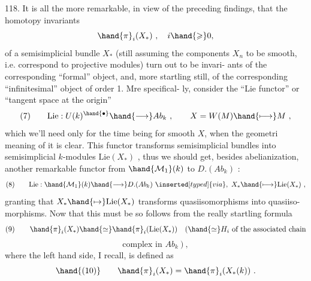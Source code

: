 118. It is all the more remarkable, in view of the preceding findings,
that the homotopy invariants
\[ \hand{\pi}_i(X_*) \ , \quad i \hand{\geqslant} 0 , \]
of a  semisimplicial  bundle $X_*$ (still assuming the components $X_n$ to be
smooth, i.e.  correspond to projective modules) turn out to be invari-%
ants of the corresponding ``formal'' object, and, more startling still,
of the corresponding ``infinitesimal'' object of order 1. Mre specifical-%
ly, consider the ``Lie functor'' or ``tangent space at the origin''
\[ (7) \qquad \mathrm{Lie}: U(k)^{\hand{\bullet}} \hand{\longrightarrow} Ab_k \ , \qquad X = W(M) \hand{\longmapsto} M \ , \]
which we'll need only for the time being for smooth $X$, when the geometri
meaning of it is clear. This functor transforms semisimplicial  bundles
into semisimplicial $k$-modules $\mathrm{Lie}(X_*)$ , thus we should get, besides
abelianization, another remarkable functor\hand{,} from $\hand{\mathcal{M}_1}(k)$  to $D.(Ab_k)$ :
\[ (8) \qquad \mathrm{Lie}: \hand{\mathcal{M}_1}(k) \hand{\longrightarrow} D.(Ab_k) \ \inserted[typed]{via}, \ X_* \hand{\longmapsto} \mathrm{Lie}(X_*) \ , \]
granting that $X_* \hand{\mapsto} \mathrm{Lie}(X_*)$ transforms quasiisomorphisms into quasiiso-%
morphisms. Now that this must be so follows from the really startling
formula
\[ (9) \qquad \hand{\pi}_i(X_*) \hand{\simeq} \hand{\pi}_i(\mathrm{Lie}(X_*)) \quad (\hand{\simeq} H_i \text{ of the associated chain} \]
\[ \text{complex in } Ab_k \ ) \ , \]
where the left hand side, I recall, is defined as
\[ \hand{(10)} \qquad \hand{\pi}_i(X_*) = \hand{\pi}_i(X_*(k)) \ . \]


